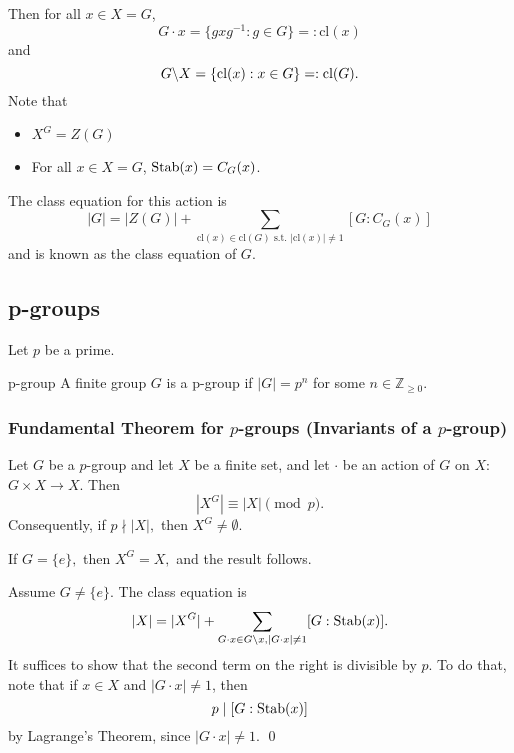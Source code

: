 \documentclass{article}
\renewenvironment{proof}{{\bfseries\color{blue1} Proof:}}{\qed}
\begin{document}
Then for all $x\in X=G$, $$G\cdot x = \{gxg^{-1}:g\in G\}=: \text{cl}(x)$$
and
\begin{equation*}
    G\text{\textbackslash} X = \{\text{cl}(x):x\in G\} =: \text{cl}(G).
\end{equation*}
Note that
\begin{itemize}
    \item $X^G = Z(G)$
    \item For all $x\in X=G$, $\operatorname{Stab}(x)=C_G(x)$.
\end{itemize}
The class equation for this action is
\begin{equation*}
    |G| = |Z(G)| + \sum_{\text{cl}(x)\in\text{cl}(G) \text{ s.t. } |\text{cl}(x)| \neq 1} [G:C_G(x)]
\end{equation*}
and is known as the class equation of $G$.
\subsection{p-groups}
Let $p$ be a prime.
\begin{definition}{p-group}
    A finite group $G$ is a p-group if $|G|=p^n$ for some $n\in \mathbb{Z}_{\ge 0}$.
\end{definition}
\subsubsection{Fundamental Theorem for $p$-groups (Invariants of a $p$-group)}
\begin{idea}
    Let $G$ be a $p$-group and let $X$ be a finite set, and let $\cdot$ be an action of $G$ on $X$: $G\times X \rightarrow X$. Then
    \begin{equation*}
        |X^G| \equiv |X| \pmod{p}.
    \end{equation*}
    Consequently, if $p \nmid |X|,$ then $X^G \neq \emptyset$.
\end{idea}
\begin{proof}
    If $G=\{e\},$ then $X^G=X,$ and the result follows.

    Assume $G\neq \{e\}$. The class equation is
    \begin{equation*}
        |X| = |X^G| + \sum_{G\cdot x \in G\text{\textbackslash} x, |G\cdot x|\neq 1} [G:\operatorname{Stab}(x)].
    \end{equation*}
    It suffices to show that the second term on the right is divisible by $p$. To do that, note that if $x\in X$ and $|G\cdot x| \neq 1$, then
    \begin{equation*}
        p \mid [G:\operatorname{Stab}(x)]
    \end{equation*}
    by Lagrange's Theorem, since $|G\cdot x| \neq 1$.
\end{proof}
\end{document}
